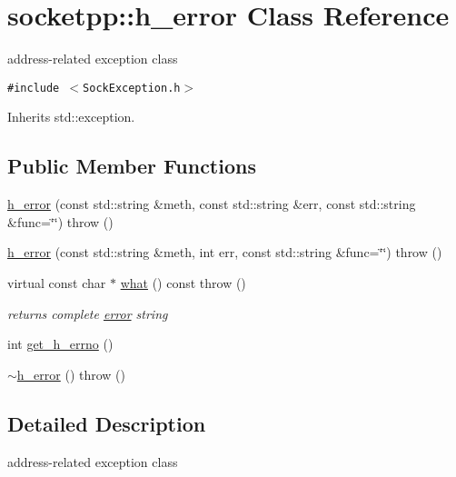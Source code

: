 \hypertarget{classsocketpp_1_1h__error}{
\section{socketpp::h\_\-error Class Reference}
\label{classsocketpp_1_1h__error}
}
address-related exception class  


{\tt \#include $<$SockException.h$>$}

Inherits std::exception.

\subsection*{Public Member Functions}
\begin{CompactItemize}
\item 
\hyperlink{classsocketpp_1_1h__error_c15a1c6216114250241349fdfcdeb98a}{h\_\-error} (const std::string \&meth, const std::string \&err, const std::string \&func=\char`\"{}\char`\"{})  throw ()
\item 
\hyperlink{classsocketpp_1_1h__error_67e7b6bcd23ebdd79a5fdcf1f01070fe}{h\_\-error} (const std::string \&meth, int err, const std::string \&func=\char`\"{}\char`\"{})  throw ()
\item 
virtual const char $\ast$ \hyperlink{classsocketpp_1_1h__error_055c1a5b55b5d02fe81fd74cb8b900d2}{what} () const   throw ()
\begin{CompactList}\small\item\em returns complete \hyperlink{classsocketpp_1_1error}{error} string \item\end{CompactList}\item 
int \hyperlink{classsocketpp_1_1h__error_b2aabd50ea2f3189b09bc749a875e38f}{get\_\-h\_\-errno} ()
\item 
\hyperlink{classsocketpp_1_1h__error_56261f751b9080d0a67f282e7ab2974b}{$\sim$h\_\-error} ()  throw ()
\end{CompactItemize}


\subsection{Detailed Description}
address-related exception class 


